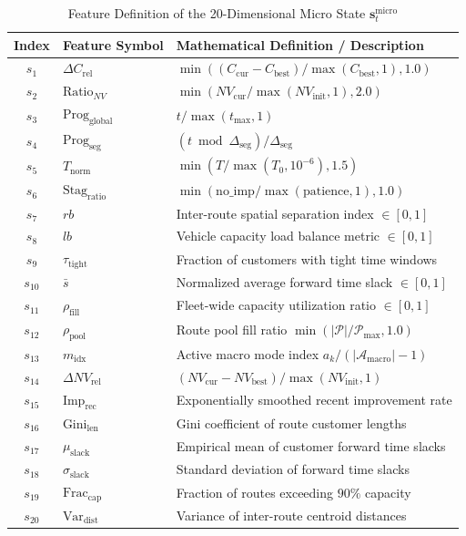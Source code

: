 \begin{table}[!t]
\caption{Feature Definition of the 20-Dimensional Micro State $\mathbf{s}_t^{\text{micro}}$}
\label{tab:micro_state}
\centering
\footnotesize
\begin{tabularx}{\columnwidth}{c l X}
\toprule
\textbf{Index} & \textbf{Feature Symbol} & \textbf{Mathematical Definition / Description} \\
\midrule
$s_1$ & $\Delta C_{\text{rel}}$ & $\min((C_{\text{cur}} - C_{\text{best}})/\max(C_{\text{best}}, 1), 1.0)$ \\
$s_2$ & $\text{Ratio}_{NV}$ & $\min(NV_{\text{cur}}/\max(NV_{\text{init}}, 1), 2.0)$ \\
$s_3$ & $\text{Prog}_{\text{global}}$ & $t / \max(t_{\max}, 1)$ \\
$s_4$ & $\text{Prog}_{\text{seg}}$ & $(t \bmod \Delta_{\text{seg}}) / \Delta_{\text{seg}}$ \\
$s_5$ & $T_{\text{norm}}$ & $\min(T / \max(T_0, 10^{-6}), 1.5)$ \\
$s_6$ & $\text{Stag}_{\text{ratio}}$ & $\min(\text{no\_imp} / \max(\text{patience}, 1), 1.0)$ \\
$s_7$ & $rb$ & Inter-route spatial separation index $\in [0, 1]$ \\
$s_8$ & $lb$ & Vehicle capacity load balance metric $\in [0, 1]$ \\
$s_9$ & $\tau_{\text{tight}}$ & Fraction of customers with tight time windows \\
$s_{10}$ & $\bar{s}$ & Normalized average forward time slack $\in [0, 1]$ \\
$s_{11}$ & $\rho_{\text{fill}}$ & Fleet-wide capacity utilization ratio $\in [0, 1]$ \\
$s_{12}$ & $\rho_{\text{pool}}$ & Route pool fill ratio $\min(|\mathcal{P}|/\mathcal{P}_{\max}, 1.0)$ \\
$s_{13}$ & $m_{\text{idx}}$ & Active macro mode index $a_k / (|\mathcal{A}_{\text{macro}}| - 1)$ \\
$s_{14}$ & $\Delta NV_{\text{rel}}$ & $(NV_{\text{cur}} - NV_{\text{best}}) / \max(NV_{\text{init}}, 1)$ \\
$s_{15}$ & $\text{Imp}_{\text{rec}}$ & Exponentially smoothed recent improvement rate \\
$s_{16}$ & $\text{Gini}_{\text{len}}$ & Gini coefficient of route customer lengths \\
$s_{17}$ & $\mu_{\text{slack}}$ & Empirical mean of customer forward time slacks \\
$s_{18}$ & $\sigma_{\text{slack}}$ & Standard deviation of forward time slacks \\
$s_{19}$ & $\text{Frac}_{\text{cap}}$ & Fraction of routes exceeding $90\%$ capacity \\
$s_{20}$ & $\text{Var}_{\text{dist}}$ & Variance of inter-route centroid distances \\
\bottomrule
\end{tabularx}
\end{table}

